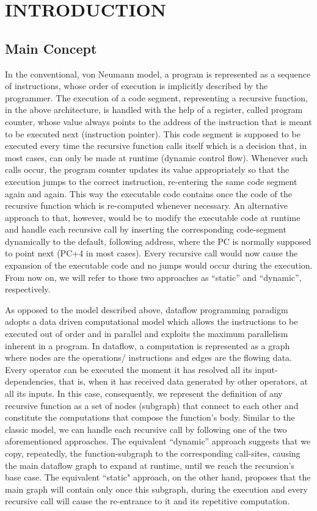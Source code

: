 \documentclass[ack,preface]{dithesis}
\begin{document}
\frontmatter

\mainmatter


\chapter{INTRODUCTION}
    \section{Main Concept}
	In the conventional, von Neumann model, a program is represented as a sequence of instructions, whose order of execution is implicitly described by the programmer.
The execution of a code segment, representing a recursive function, in the above architecture, is handled with the help of a register, called program counter, whose value always points to the address of the instruction that is meant to be executed next (instruction pointer). This code segment is supposed to be executed every time the recursive function calls itself which is a decision that, in most cases, can only be made at runtime (dynamic control flow). Whenever such calls occur, the program counter updates its value appropriately so that the execution jumps to the correct instruction, re-entering the same code segment again and again. This way the executable code contains once the code of the recursive function which is re-computed whenever necessary. An alternative approach to that, however, would be to modify the executable code at runtime  and handle each recursive call by inserting the corresponding code-segment dynamically to the default, following address, where the PC is normally supposed to point next (PC+4 in most cases). Every recursive call would now cause the expansion of the executable code and no jumps would occur during the execution.
From now on, we will refer to those two approaches as ``static'' and ``dynamic'', respectively.

As opposed to the model described above, dataflow programming paradigm adopts a data driven computational model which allows the instructions to be executed out of order and in parallel and exploits the maximum parallelism inherent in a program. In dataflow, a computation is represented as a graph where nodes are the operations/ instructions and edges are the flowing data. Every operator can be executed the moment it has resolved all its input-dependencies, that is, when it has received data generated  by other operators, at all its inputs.
In this case, consequently, we represent the definition of any recursive function as  a set of nodes (subgraph) that connect to each other and constitute the computations that compose the function’s body. Similar to the classic model, we can handle each recursive call by following one of the two aforementioned approaches. 
 The equivalent ``dynamic'' approach suggests that we copy, repeatedly, the function-subgraph to the corresponding call-sites, causing the main dataflow graph to expand at runtime, until we reach the recursion's base case. The equivalent ``static" approach, on the other hand, proposes that the main graph will contain only once this subgraph, during the execution and every recursive call will cause the re-entrance to it and its repetitive computation.
\end{document}

